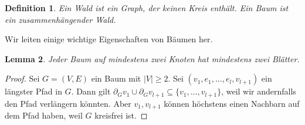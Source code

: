 \documentclass[10pt,reqno]{amsart}
\numberwithin{equation}{section}
\renewcommand\subset{\subseteq}
\newtheorem{definition}{Definition}[section]
\newtheorem{lemma}[definition]{Lemma}
\begin{document}
\begin{definition}\label{def_baum}
Ein {\em Wald} ist ein Graph, der keinen Kreis enth\"alt.
Ein {\em Baum} ist ein zusammenh\"angender Wald.
\end{definition}

Wir leiten einige wichtige Eigenschaften von B\"aumen her.

\begin{lemma}\label{Lemma_Blatt}
Jeder Baum auf mindestens zwei Knoten hat mindestens zwei Bl\"atter.
\end{lemma}
\begin{proof}
Sei $G=(V,E)$ ein Baum mit $|V|\geq2$.
Sei $(v_1,e_1,\ldots,e_l,v_{l+1})$ ein l\"angster Pfad in $G$.
Dann gilt $\partial_Gv_1\cup \partial_Gv_{l+1}\subset\{v_1,\ldots,v_{l+1}\}$, weil wir andernfalls den Pfad verl\"angern k\"onnten.
Aber $v_1,v_{l+1}$ k\"onnen h\"ochstens einen Nachbarn auf dem Pfad haben, weil $G$ kreisfrei ist.
\end{proof}
\end{document}

